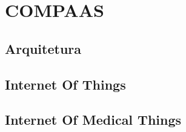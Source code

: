 \section{COMPAAS}
\label{sec:COMPAAS}

\subsection{Arquitetura}

\subsection{Internet Of Things}

\subsection{Internet Of Medical Things}
